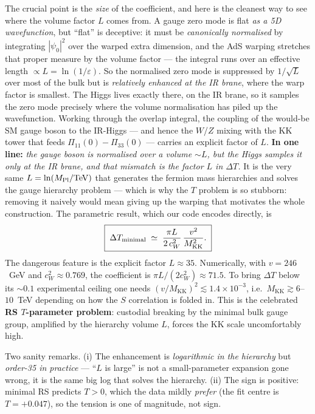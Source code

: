 \documentclass[11pt]{article}
\newcommand{\MKK}{M_{\mathrm{KK}}}
\newcommand{\cwsq}{c_W^2}
\newcommand{\Pibig}{\Pi}
\newcommand{\vev}{v}
\newcommand{\eps}{\varepsilon}
\theoremstyle{definition}
\begin{document}
The crucial point is the \emph{size} of the coefficient, and here is the cleanest
way to see where the volume factor $L$ comes from. A gauge zero mode is flat
\emph{as a 5D wavefunction}, but ``flat'' is deceptive: it must be
\emph{canonically normalised} by integrating $|\psi_0|^2$ over the warped extra
dimension, and the AdS warping stretches that proper measure by the volume
factor --- the integral runs over an effective length $\propto L = \ln(1/\eps)$.
So the normalised zero mode is suppressed by $1/\sqrt{L}$ over most of the bulk
but is \emph{relatively enhanced at the IR brane}, where the warp factor is
smallest. The Higgs lives exactly there, on the IR brane, so it samples the
zero mode precisely where the volume normalisation has piled up the
wavefunction. Working through the overlap integral, the coupling of the would-be
SM gauge boson to the IR-Higgs --- and hence the $W$/$Z$ mixing with the KK tower
that feeds $\Pibig_{11}(0)-\Pibig_{33}(0)$ --- carries an explicit factor of $L$.
\textbf{In one line:} \emph{the gauge boson is normalised over a volume $\sim L$,
but the Higgs samples it only at the IR brane, and that mismatch is the factor
$L$ in $\Delta T$.} It is the very same $L = \ln(M_{\rm Pl}/\mathrm{TeV})$ that
generates the fermion mass hierarchies and solves the gauge hierarchy
problem --- which is why the $T$ problem is so stubborn: removing it naively
would mean giving up the warping that motivates the whole construction. The
parametric result, which our code encodes directly, is
\begin{equation}
\boxed{\;\Delta T_{\rm minimal} \;\simeq\; \frac{\pi L}{2\,\cwsq}\,
\frac{\vev^2}{\MKK^2}.\;}
\label{eq:Tmin}
\end{equation}
The dangerous feature is the explicit factor $L\approx 35$. Numerically, with
$\vev = 246$~GeV and $\cwsq \approx 0.769$, the coefficient is
$\pi L/(2\cwsq) \approx 71.5$. To bring $\Delta T$ below its $\sim 0.1$
experimental ceiling one needs $(\vev/\MKK)^2 \lesssim 1.4\times10^{-3}$, i.e.\
$\MKK \gtrsim 6$--$10$~TeV depending on how the $S$ correlation is folded in. This
is the celebrated \textbf{RS $T$-parameter problem}: custodial breaking by the
minimal bulk gauge group, amplified by the hierarchy volume $L$, forces the KK
scale uncomfortably high.

Two sanity remarks. (i) The enhancement is \emph{logarithmic in the hierarchy} but
\emph{order-35 in practice} --- ``$L$ is large'' is not a small-parameter
expansion gone wrong, it is the same big log that solves the hierarchy. (ii) The
sign is positive: minimal RS predicts $T>0$, which the data mildly \emph{prefer}
(the fit centre is $T=+0.047$), so the tension is one of magnitude, not sign.
\end{document}
